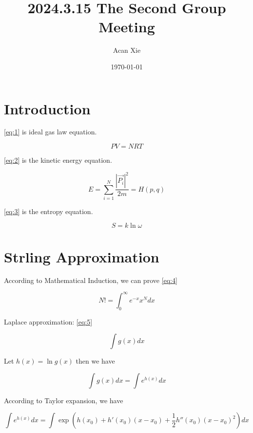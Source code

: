 \documentclass{article}
\title{2024.3.15 The Second Group Meeting}
\author{Acan Xie}
\date{\today}
\begin{document}
\maketitle

\section{Introduction}

\eqref{eq:1} is ideal gas law equation.

\begin{equation}\label{eq:1}
    PV=NRT
\end{equation}

\eqref{eq:2} is the kinetic energy equation.

\begin{equation}\label{eq:2}
    E = \sum_{i=1}^{N}\frac{|\vec{P_i}|^2}{2m}=H(p,q)
\end{equation}

\eqref{eq:3} is the entropy equation.

\begin{equation}\label{eq:3}
    S=k\ln\omega
\end{equation}

\section{Strling Approximation}

According to Mathematical Induction, we can prove \eqref{eq:4}

\begin{equation}\label{eq:4}
    N! = \int_{0}^{\infty} e^{-x}x^Ndx
\end{equation}

Laplace approximation: \eqref{eq:5}

\begin{equation}\label{eq:5}
    \int g(x)dx
\end{equation}

Let $h(x)=\ln g(x)$ then we have

\begin{equation}\label{eq:6}
    \int g(x)dx=\int e^{h(x)}dx
\end{equation}

According to Taylor expansion, we have

\begin{equation}\label{eq:7}
    \int e^{h(x)}dx = \int \exp(h(x_0)+h'(x_0)(x-x_0)+\frac{1}{2}h''(x_0)(x-x_0)^2)dx
\end{equation}
\end{document}
